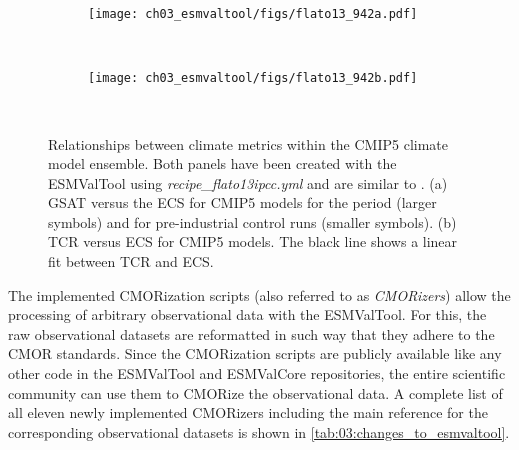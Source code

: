 \begin{figure}[t]
  \centering
  \begin{subfigure}[b]{0.35\columnwidth}
    \texttt{[image: ch03\_esmvaltool/figs/flato13\_942a.pdf]}
    \caption{}
    \label{fig:03:flato13:a}
  \end{subfigure}
  ~
  \begin{subfigure}[b]{0.35\columnwidth}
    \texttt{[image: ch03\_esmvaltool/figs/flato13\_942b.pdf]}
    \caption{}
    \label{fig:03:flato13:b}
  \end{subfigure}
  ~
  \begin{subfigure}[b]{0.25\columnwidth}
  \end{subfigure}
  \caption{Relationships between climate metrics within the \acs{CMIP}5 climate
    model ensemble. Both panels have been created with the \acs{ESMValTool}
    using \emph{recipe\_flato13ipcc.yml} and are similar to
    \textcite{Flato2013}. (a) \Acf{GSAT} versus the \acf{ECS} for \acs{CMIP}5
    models for the period  (larger symbols) and for
    pre-industrial control runs (smaller symbols). (b) \acf{TCR} versus
    \acs{ECS} for \acs{CMIP}5 models. The black line shows a linear fit
    between \acs{TCR} and \acs{ECS}.}
  \label{fig:03:flato13}
\end{figure}

The implemented \ac{CMOR}ization scripts (also referred to as
\emph{\ac{CMOR}izers}) allow the processing of arbitrary observational data
with the \ac{ESMValTool}. For this, the raw observational datasets are
reformatted in such way that they adhere to the \ac{CMOR} standards. Since the
\ac{CMOR}ization scripts are publicly available like any other code in the
\ac{ESMValTool} and \ac{ESMValCore} repositories, the entire scientific
community can use them to \ac{CMOR}ize the observational data. A complete list
of all eleven newly implemented \ac{CMOR}izers including the main reference for
the corresponding observational datasets is shown in
\cref{tab:03:changes_to_esmvaltool}.
